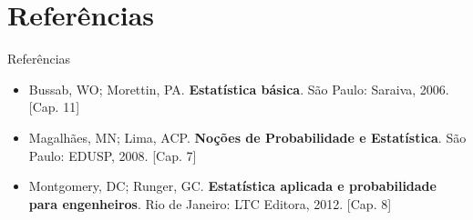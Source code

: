 \documentclass[10pt]{beamer}\usepackage[]{graphicx}\usepackage[]{color}
\theoremstyle{definition}
\begin{document}
\section{Referências}

\begin{frame}{Referências}
  \begin{itemize}
  \item Bussab, WO; Morettin, PA. \textbf{Estatística básica}. São
    Paulo: Saraiva, 2006. [Cap. 11]
  \item Magalhães, MN; Lima, ACP. \textbf{Noções de Probabilidade e
      Estatística}. São Paulo: EDUSP, 2008. [Cap. 7]
  \item Montgomery, DC; Runger, GC. \textbf{Estatística aplicada e
      probabilidade para engenheiros}. Rio de Janeiro: LTC Editora,
    2012. [Cap. 8]
  \end{itemize}
\end{frame}
\end{document}
